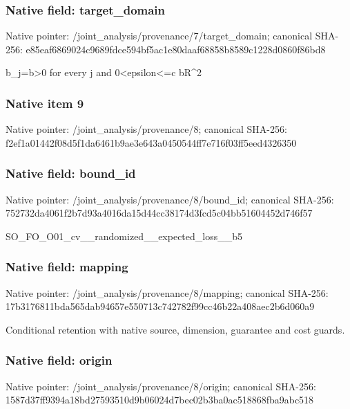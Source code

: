 \documentclass[10pt,a4paper]{article}
\begin{document}
\subsubsection{Native field: target\_\allowbreak{}domain}
Native pointer: /joint\_\allowbreak{}analysis/provenance/7/target\_\allowbreak{}domain; canonical SHA-256: e85eaf6869024c9689fdce594bf5ac1e80daaf68858b8589c1228d0860f86bd8

\begingroup\raggedright\sloppy b\_\allowbreak{}j=\allowbreak{}b>0 for every j and 0<epsilon<=\allowbreak{}c bR\textasciicircum{}2\par\endgroup

\subsubsection{Native item 9}
Native pointer: /joint\_\allowbreak{}analysis/provenance/8; canonical SHA-256: f2ef1a01442f08d5f1da6461b9ae3e643a0450544ff7e716f03ff5eed4326350

\subsubsection{Native field: bound\_\allowbreak{}id}
Native pointer: /joint\_\allowbreak{}analysis/provenance/8/bound\_\allowbreak{}id; canonical SHA-256: 752732da4061f2b7d93a4016da15d44cc38174d3fcd5c04bb51604452d746f57

\begingroup\raggedright\sloppy SO\_\allowbreak{}FO\_\allowbreak{}O01\_\allowbreak{}cv\_\allowbreak{}\_\allowbreak{}randomized\_\allowbreak{}\_\allowbreak{}expected\_\allowbreak{}loss\_\allowbreak{}\_\allowbreak{}b5\par\endgroup

\subsubsection{Native field: mapping}
Native pointer: /joint\_\allowbreak{}analysis/provenance/8/mapping; canonical SHA-256: 17b3176811bda565dab94657e550713c742782f99cc46b22a408aec2b6d060a9

\begingroup\raggedright\sloppy Conditional retention with native source,\allowbreak{} dimension,\allowbreak{} guarantee and cost guards.\par\endgroup

\subsubsection{Native field: origin}
Native pointer: /joint\_\allowbreak{}analysis/provenance/8/origin; canonical SHA-256: 1587d37ff9394a18bd27593510d9b06024d7bec02b3ba0ac518868fba9abc518
\end{document}

